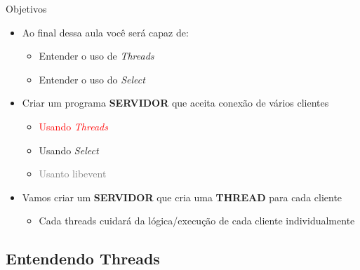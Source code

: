 \documentclass[10pt, xcolor=x11names]{beamer}
\begin{document}
\begin{frame}
	\begin{block}{Objetivos}
		\begin{itemize}
			\item Ao final dessa aula você será capaz de:
			\begin{itemize}
				\item Entender o uso de \textit{Threads}
				\item Entender o uso do \textit{Select}
			\end{itemize}
			\item Criar um programa \textbf{SERVIDOR} que aceita conexão de vários clientes
			\begin{itemize}
				\item \textcolor<2->{red}{Usando \textit{Threads}}
				\item Usando \textit{Select}
				\item \textcolor{gray}{Usanto libevent}
			\end{itemize}
		\end{itemize}
		\begin{itemize}
			\item<2-> Vamos criar um \textbf{SERVIDOR} que cria uma \textbf{THREAD} para cada cliente
			\begin{itemize}
				\item Cada threads cuidará da lógica/execução de cada cliente individualmente
			\end{itemize}
		\end{itemize}
	\end{block}
\end{frame}

\subsection{Entendendo Threads} %
\end{document}
